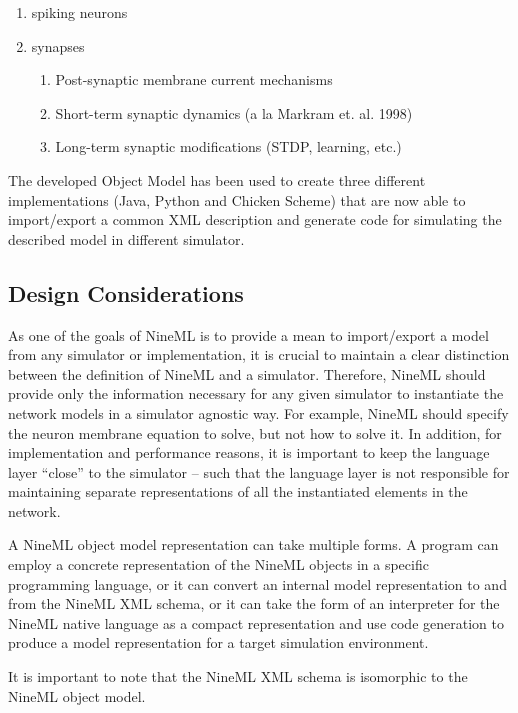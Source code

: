 \documentclass{article}
\begin{document}
\begin{enumerate}
\item spiking neurons
\item synapses
\begin{enumerate}
\item Post-synaptic membrane current mechanisms
\item Short-term synaptic dynamics (a la Markram et. al. 1998)
\item Long-term synaptic modifications (STDP, learning, etc.)
\end{enumerate}
\end{enumerate}

The developed Object Model has been used to create three different
implementations (Java, Python and Chicken Scheme) that are now able to
import/export a common XML description and generate code for simulating the
described model in different simulator.

\subsection{Design Considerations}

As one of the goals of NineML is to provide a mean to import/export a model from
any simulator or implementation, it is crucial to maintain a clear distinction
between the definition of NineML and a simulator. Therefore, NineML should
provide only the information necessary for any given simulator
to instantiate the network models in a simulator agnostic way.
For example, NineML should specify the neuron membrane equation to solve,
but not how to solve it.  In addition, for implementation and performance
reasons, it is important to keep the language layer ``close'' to the simulator
-- such that the language layer is not responsible for maintaining separate
representations of all the instantiated elements in the network.

A NineML object model representation can take multiple forms.  A
program can employ a concrete representation of the NineML objects in
a specific programming language, or it can convert an internal model
representation to and from the NineML XML schema, or it can take the
form of an interpreter for the NineML native language as a compact
representation and use code generation to produce a model
representation for a target simulation environment.

It is important to note that the NineML XML schema is isomorphic to the NineML
object model.
\end{document}
